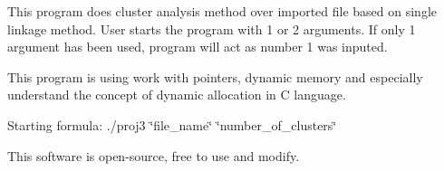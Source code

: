This program does cluster analysis method over imported file based on single linkage method. User starts the program with 1 or 2 arguments. If only 1 argument has been used, program will act as number 1 was inputed.

This program is using work with pointers, dynamic memory and especially understand the concept of dynamic allocation in C language.

Starting formula\+: ./proj3 \char`\"{}file\+\_\+name\char`\"{} \char`\"{}number\+\_\+of\+\_\+clusters\char`\"{}

This software is open-\/source, free to use and modify. 
